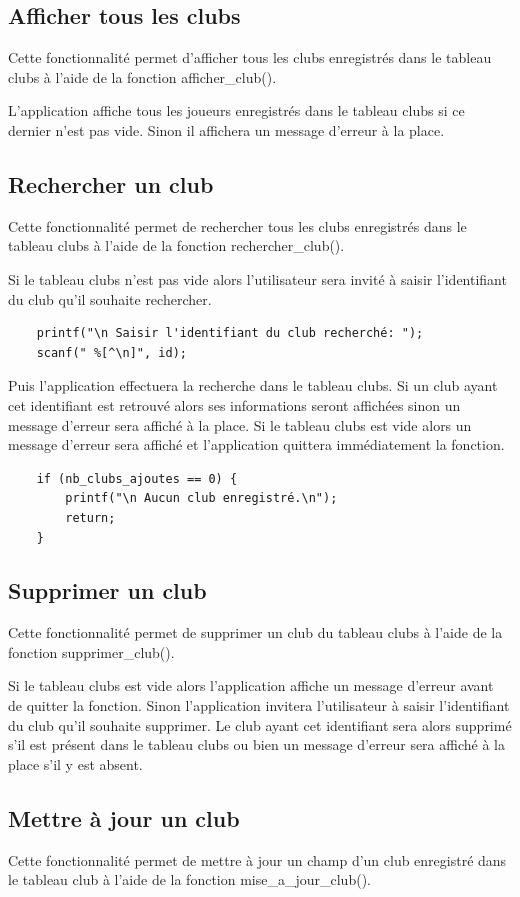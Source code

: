 \documentclass[12pt,a4paper]{report}
\begin{document}
\subsection{Afficher tous les clubs}
Cette fonctionnalité permet d'afficher tous les clubs enregistrés dans le tableau clubs à l'aide de la fonction afficher\_club().

L'application affiche tous les joueurs enregistrés dans le tableau clubs si ce dernier n'est pas vide. Sinon il affichera un message d'erreur à la place.

\subsection{Rechercher un club}
Cette fonctionnalité permet de rechercher tous les clubs enregistrés dans le tableau clubs à l'aide de la fonction rechercher\_club().

Si le tableau clubs n'est pas vide alors l'utilisateur sera invité à saisir l'identifiant du club qu'il souhaite rechercher.
\begin{lstlisting}
	printf("\n Saisir l'identifiant du club recherché: ");    
	scanf(" %[^\n]", id);
\end{lstlisting}
Puis l'application effectuera la recherche dans le tableau clubs. Si un club ayant cet identifiant est retrouvé alors ses informations seront affichées sinon un message d'erreur sera affiché à la place. Si le tableau clubs est vide alors un message d'erreur sera affiché et l'application quittera immédiatement la fonction.
\begin{lstlisting}
	if (nb_clubs_ajoutes == 0) {
		printf("\n Aucun club enregistré.\n");
		return;
	}   
\end{lstlisting}

\subsection{Supprimer un club}
Cette fonctionnalité permet de supprimer un club du tableau clubs à l'aide de la fonction supprimer\_club().

Si le tableau clubs est vide alors l'application affiche un message d'erreur avant de quitter la fonction.
Sinon l'application invitera l'utilisateur à saisir l'identifiant du club qu'il souhaite supprimer. Le club ayant cet identifiant sera alors supprimé s'il est présent dans le tableau clubs ou bien un message d'erreur sera affiché à la place s'il y est absent.

\subsection{Mettre à jour un club}
Cette fonctionnalité permet de mettre à jour un champ d'un club enregistré dans le tableau club à l'aide de la fonction mise\_a\_jour\_club().
\end{document}
